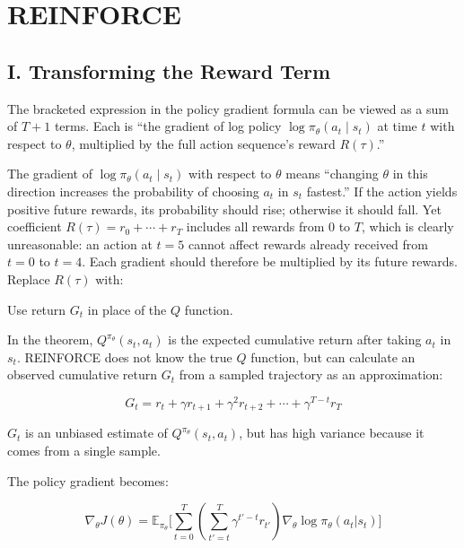 \setcounter{section}{1}

\hypertarget{reinforce}{%
\section{REINFORCE}\label{reinforce}}

\hypertarget{i.-transforming-the-reward-term}{%
\subsection{I. Transforming the Reward Term}\label{i.-transforming-the-reward-term}}

The bracketed expression in the policy gradient formula can be viewed as a sum of \(T+1\) terms. Each is ``the gradient of log policy \(\log\pi_\theta(a_t\mid s_t)\) at time \(t\) with respect to \(\theta\), multiplied by the full action sequence's reward \(R(\tau)\).''

The gradient of \(\log\pi_\theta(a_t\mid s_t)\) with respect to \(\theta\) means ``changing \(\theta\) in this direction increases the probability of choosing \(a_t\) in \(s_t\) fastest.'' If the action yields positive future rewards, its probability should rise; otherwise it should fall. Yet coefficient \(R(\tau)=r_0+\cdots+r_T\) includes all rewards from 0 to \(T\), which is clearly unreasonable: an action at \(t=5\) cannot affect rewards already received from \(t=0\) to \(t=4\). Each gradient should therefore be multiplied by its future rewards. Replace \(R(\tau)\) with:

Use return \(G_t\) in place of the \(Q\) function.

In the theorem, \(Q^{\pi_\theta}(s_t,a_t)\) is the expected cumulative return after taking \(a_t\) in \(s_t\). REINFORCE does not know the true \(Q\) function, but can calculate an observed cumulative return \(G_t\) from a sampled trajectory as an approximation:

\[
G_t=r_t+\gamma r_{t+1}+\gamma^{2}r_{t+2}+\cdots+\gamma^{T-t}r_T
\]

\(G_t\) is an unbiased estimate of \(Q^{\pi_\theta}(s_t,a_t)\), but has high variance because it comes from a single sample.

The policy gradient becomes:

\[
\nabla_\theta J(\theta)
=\mathbb{E}_{\pi_\theta}
\bigl[
\sum_{t=0}^{T}
(\sum_{t'=t}^{T}\gamma^{t'-t}r_{t'})
\nabla_\theta\log\pi_\theta(a_t|s_t)
\bigr]
\]

